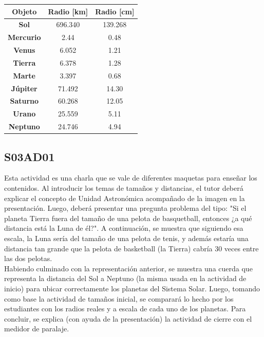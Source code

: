 \documentclass[10pt,a4paper]{article}
\begin{document}
\begin{table}[H]
\begin{tabular}{|c|c|c|}
\hline
\textbf{Objeto}   & \textbf{Radio {[}km{]}}                               & \textbf{Radio {[}cm{]}} \\ \hline
\textbf{Sol}      & 696.340                                               & 139.268                 \\ \hline
\textbf{Mercurio} &  2.44  & 0.48                    \\ \hline
\textbf{Venus}    & 6.052  & 1.21           \\ \hline
\textbf{Tierra}   & 6.378                                                 & 1.28                    \\ \hline
\textbf{Marte}    & 3.397   & 0.68                    \\ \hline
\textbf{Júpiter}  &  71.492 & 14.30            \\ \hline
\textbf{Saturno}  &60.268 & 12.05       \\ \hline
\textbf{Urano}    & 25.559                                                & 5.11                    \\ \hline
\textbf{Neptuno}  & 24.746                                                & 4.94                    \\ \hline
\end{tabular}
\end{table}

\subsection{S03AD01}
Esta actividad es una charla que se vale de diferentes maquetas para enseñar los contenidos. Al introducir los temas de tamaños y distancias, el tutor deberá explicar el concepto de Unidad Astronómica acompañado de la imagen en la presentación. Luego, deberá presentar una pregunta problema del tipo: "Si el planeta Tierra fuera del tamaño de una pelota de basquetball, entonces ¿a qué distancia está la Luna de él?". A continuación, se muestra que siguiendo esa escala, la Luna sería del tamaño de una pelota de tenis, y además estaría una distancia tan grande que la pelota de basketball (la Tierra) cabría 30 veces entre las dos pelotas. \\

Habiendo culminado con la representación anterior, se muestra una cuerda que representa la distancia del Sol a Neptuno (la misma usada en la actividad de inicio) para ubicar correctamente los planetas del Sistema Solar. Luego, tomando como base la actividad de tamaños inicial, se comparará lo hecho por los estudiantes con los radios reales y a escala de cada uno de los planetas. Para concluir, se explica (con ayuda de la presentación) la actividad de cierre con el medidor de paralaje.
\end{document}
